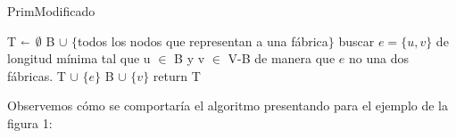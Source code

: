 \begin{algorithm}[H]
\caption{PrimModificado}\label{ej1}
\begin{algorithmic}[1]
	\State T  $\shortleftarrow$ $\emptyset$
	\State B $\cup$ $\{$todos los nodos que representan a una fábrica$\}$
		\State buscar $e=\{u,v\}$ de longitud mínima tal que u $\in$ B y v $\in$ V-B de manera que $e$ no una dos fábricas.
		\State T $\cup$ $\{e\}$
		\State B $\cup$ $\{v\}$
	\EndWhile
	\State return T
\EndProcedure
\end{algorithmic}
\end{algorithm}

Observemos cómo se comportaría el algoritmo presentando para el ejemplo de la figura 1:

